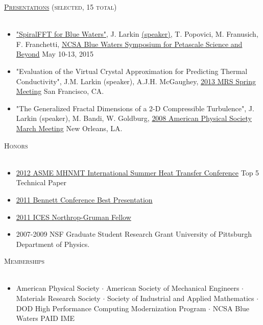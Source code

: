 \documentclass{article}
\newcommand{\lineunder}{\vspace*{-8pt} \\ \hspace*{-18pt} \hrulefill \\}
\newcommand{\header}[1]{{\hspace*{-15pt}\vspace*{6pt} \textsc{#1}} \vspace*{-6pt} \lineunder}
\newenvironment{achievements}{\begin{list}{$\bullet$}{\topsep 0pt \itemsep -2pt}}{\vspace*{4pt}\end{list}}
\begin{document}
\header{\href{http://jasonlarkin.org/pres.html}{Presentations} (selected, 15 total)}
\begin{itemize}[leftmargin=*]
\item \href{https://bluewaters.ncsa.illinois.edu/documents/10157/5a0a0d37-95bf-460b-a7f0-cfadd15abec8}{"SpiralFFT for Blue Waters"}, J. Larkin \href{https://www.youtube.com/watch?v=rjbEWeu2Nwc&feature=youtu.be#t=51m53s}{(speaker)}, T. Popovici, M. Franusich, F. Franchetti, \href{https://bluewaters.ncsa.illinois.edu/paid-ime#SPIRAL FFT}{NCSA Blue Waters Symposium for Petascale Science and Beyond} May 10-13, 2015
\item "Evaluation of the Virtual Crystal Approximation for Predicting Thermal Conductivity", J.M. Larkin (speaker), A.J.H.
   McGaughey, \href{http://www.mrs.org/spring2013/}{2013 MRS Spring Meeting} San Francisco, CA.
\item "The Generalized Fractal Dimensions of a 2-D Compressible Turbulence", J. Larkin (speaker), M. Bandi, W. Goldburg, \href{http://meetings.aps.org/Meeting/MAR08/Content/1017}{2008 American Physical Society March Meeting} New Orleans, LA.

\end{itemize}


\header{Honors}
\begin{itemize}[leftmargin=*]
\item \href{http://www.asmeconferences.org/HT2012/}{2012 ASME MHNMT International Summer Heat Transfer Conference} Top 5 Technical Paper
\item \href{http://www.cmu.edu/me/news/archive/2011/bennett-conference.html}{2011 Bennett Conference Best Presentation}
\item \href{http://www.ices.cmu.edu/newsitem.asp?NewsID=749}{2011 ICES Northrop-Gruman Fellow}
\item 2007-2009 NSF Graduate Student Research Grant University of Pittsburgh Department of Physics.
\end{itemize}

\header{Memberships}
\begin{itemize}[leftmargin=*]
\item American Physical Society $\cdot$ American Society of Mechanical Engineers 
$\cdot$ Materials Research Society $\cdot$ Society of Industrial and Applied Mathematics $\cdot$ DOD High Performance Computing Modernization Program $\cdot$ NCSA Blue Waters PAID IME
\end{itemize}
\end{document}
